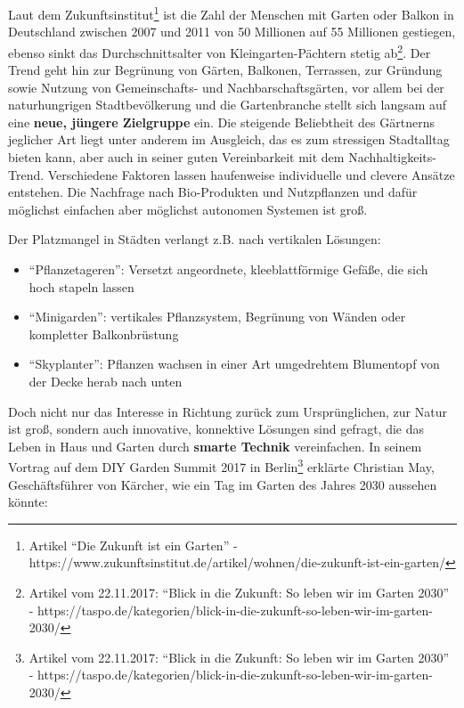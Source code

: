 Laut dem Zukunftsinstitut\footnote{Artikel ``Die Zukunft ist ein
  Garten'' -
  https://www.zukunftsinstitut.de/artikel/wohnen/die-zukunft-ist-ein-garten/}
ist die Zahl der Menschen mit Garten oder Balkon in Deutschland zwischen
2007 und 2011 von 50 Millionen auf 55 Millionen gestiegen, ebenso sinkt
das Durchschnittsalter von Kleingarten-Pächtern stetig ab\footnote{Artikel
  vom 22.11.2017: ``Blick in die Zukunft: So leben wir im Garten 2030''
  -
  https://taspo.de/kategorien/blick-in-die-zukunft-so-leben-wir-im-garten-2030/}.
Der Trend geht hin zur Begrünung von Gärten, Balkonen, Terrassen, zur
Gründung sowie Nutzung von Gemeinschafts- und Nachbarschaftsgärten, vor
allem bei der naturhungrigen Stadtbevölkerung und die Gartenbranche
stellt sich langsam auf eine \textbf{neue, jüngere Zielgruppe} ein. Die
steigende Beliebtheit des Gärtnerns jeglicher Art liegt unter anderem im
Ausgleich, das es zum stressigen Stadtalltag bieten kann, aber auch in
seiner guten Vereinbarkeit mit dem Nachhaltigkeits-Trend. Verschiedene
Faktoren lassen haufenweise individuelle und clevere Ansätze entstehen.
Die Nachfrage nach Bio-Produkten und Nutzpflanzen und dafür möglichst
einfachen aber möglichst autonomen Systemen ist groß.

Der Platzmangel in Städten verlangt z.B. nach vertikalen Lösungen:

\begin{itemize}
\tightlist
\item
  ``Pflanzetageren'': Versetzt angeordnete, kleeblattförmige Gefäße, die
  sich hoch stapeln lassen\\
\item
  ``Minigarden'': vertikales Pflanzsystem, Begrünung von Wänden oder
  kompletter Balkonbrüstung\\
\item
  ``Skyplanter'': Pflanzen wachsen in einer Art umgedrehtem Blumentopf
  von der Decke herab nach unten
\end{itemize}

Doch nicht nur das Interesse in Richtung zurück zum Ursprünglichen, zur
Natur ist groß, sondern auch innovative, konnektive Lösungen sind
gefragt, die das Leben in Haus und Garten durch \textbf{smarte Technik}
vereinfachen. In seinem Vortrag auf dem DIY Garden Summit 2017 in
Berlin\footnote{Artikel vom 22.11.2017: ``Blick in die Zukunft: So leben
  wir im Garten 2030'' -
  https://taspo.de/kategorien/blick-in-die-zukunft-so-leben-wir-im-garten-2030/}
erklärte Christian May, Geschäftsführer von Kärcher, wie ein Tag im
Garten des Jahres 2030 aussehen könnte:

